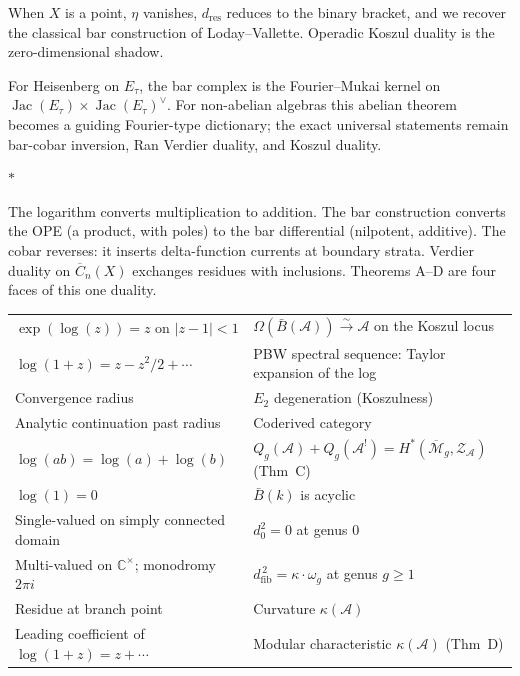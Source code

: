 \documentclass[11pt]{article}
\newcommand{\cA}{\mathcal{A}}
\newcommand{\cM}{\mathcal{M}}
\newcommand{\cZ}{\mathcal{Z}}
\newcommand{\B}{\bar{B}}
\newcommand{\C}{\mathbb{C}}
\newcommand{\dzero}{d_0}
\newcommand{\dfib}{d_{\mathrm{fib}}}
\DeclareMathOperator{\Jac}{Jac}
\newcommand{\sep}{\bigskip\begin{center}$*$\end{center}\medskip}
\begin{document}
\medskip

When $X$ is a point, $\eta$ vanishes, $d_{\mathrm{res}}$
reduces to the binary bracket, and we recover the classical bar
construction of Loday--Vallette.  Operadic Koszul duality is the
zero-dimensional shadow.

For Heisenberg on $E_\tau$, the bar complex is the Fourier--Mukai
kernel on $\Jac(E_\tau) \times \Jac(E_\tau)^\vee$.  For
non-abelian algebras this abelian theorem becomes a guiding
Fourier-type dictionary; the exact universal statements remain
bar-cobar inversion, Ran Verdier duality, and Koszul duality.

\sep

The logarithm converts multiplication to addition.  The bar
construction converts the OPE (a product, with poles) to the
bar differential (nilpotent, additive).  The cobar reverses:
it inserts delta-function currents at boundary strata.  Verdier
duality on $\overline{C}_n(X)$ exchanges residues with inclusions.
Theorems A--D are four faces of this one duality.

\begin{center}
\small
\begin{tabular}{@{}ll@{}}
$\exp(\log(z)) = z$ on $|z-1| < 1$
  & $\Omega(\B(\cA)) \xrightarrow{\sim} \cA$ on the Koszul locus \\[3pt]
$\log(1{+}z) = z - z^2/2 + \cdots$
  & PBW spectral sequence: Taylor expansion of the log \\[3pt]
Convergence radius
  & $E_2$ degeneration (Koszulness) \\[3pt]
Analytic continuation past radius
  & Coderived category \\[3pt]
$\log(ab) = \log(a) + \log(b)$
  & $Q_g(\cA) + Q_g(\cA^!) = H^*(\overline{\cM}_g, \cZ_\cA)$
  \quad(Thm~C) \\[3pt]
$\log(1) = 0$
  & $\B(k)$ is acyclic \\[3pt]
Single-valued on simply connected domain
  & $\dzero^2 = 0$ at genus $0$ \\[3pt]
Multi-valued on $\C^\times$; monodromy $2\pi i$
  & $\dfib^{\,2} = \kappa \cdot \omega_g$ at genus $g \geq 1$ \\[3pt]
Residue at branch point
  & Curvature $\kappa(\cA)$ \\[3pt]
Leading coefficient of $\log(1{+}z) = z + \cdots$
  & Modular characteristic $\kappa(\cA)$ \quad(Thm~D)
\end{tabular}
\end{center}

\medskip
\end{document}
